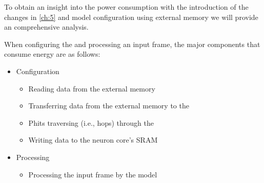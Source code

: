 To obtain an insight into the power consumption with the introduction of the \confignoc{} changes in \cref{ch:5} and model configuration using external memory we will provide an comprehensive analysis.

When configuring the \graicore{} and processing an input frame, the major components that consume energy are as follows:
\begin{itemize}
    \item Configuration
    \begin{itemize}
        \item Reading data from the external memory
        \item Transferring data from the external memory to the \confignoc{}
        \item Phits traversing (i.e., hops) through the \confignoc{}
        \item Writing data to the neuron core's SRAM
    \end{itemize}
    \item Processing
    \begin{itemize}
        \item Processing the input frame by the model
    \end{itemize}
\end{itemize}
